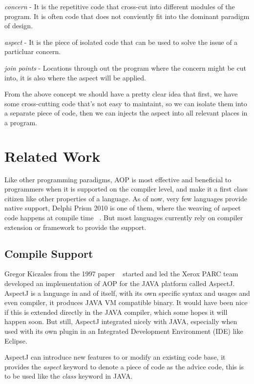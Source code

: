 {\em concern} - It is the repetitive code that cross-cut into different modules of the program. It is often code that does not conviently fit into the dominant paradigm of design.

{\em aspect} - It is the piece of isolated code that can be used to solve the issue of a particluar concern.

{\em join points} - Locations through out the program where the concern might be cut into, it is also where the aspect will be applied.

From the above concept we should have a pretty clear idea that first, we have some cross-cutting code that's not easy to maintaint, so we can isolate them into a separate piece of code, then we can injects the aspect into all relevant places in a program.

\section{Related Work}Like other programming paradigms, AOP is most effective and beneficial to programmers when it is supported on the compiler level, and make it a first class citizen like other properties of a language. As of now, very few languages provide native support, Delphi Prism 2010 is one of them, where the weaving of aspect code happens at compile time ~\cite{delphi_prism2010}. But most languages currently rely on compiler extension or framework to provide the support.

\subsection{Compile Support}

Gregor Kiczales from the 1997 paper ~\cite{aop} started and led the Xerox PARC team developed an implementation of AOP for the JAVA platform called AspectJ. AspectJ is a language in and of itself, with its own specific syntax and usages and even compiler, it produces JAVA VM compatible binary. It would have been nice if this is extended directly in the JAVA compiler, which some hopes it will happen soon. But still, AspectJ integrated nicely with JAVA, especially when used with its own plugin in an Integrated Development Environment (IDE) like Eclipse.

AspectJ can introduce new features to or modify an existing code base, it provides the {\em aspect} keyword to denote a piece of code as the advice code, this is to be used like the {\em class} keyword in JAVA.

